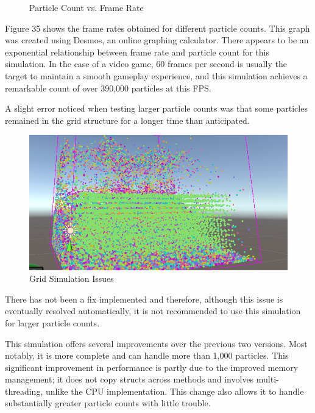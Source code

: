 \documentclass[12pt]{article}
\newcommand{\wideimage}[2][]{%
  \makebox[\textwidth][c]{\texttt{[image: \#2]}}%
}
\begin{document}
    \begin{figure}[H]
        \begin{center}
            \wideimage[width=1.15\textwidth]{exponentialRegression.png}
            \caption{Particle Count vs. Frame Rate \cite{desmos}}
        \end{center}
    \end{figure}

    Figure 35 shows the frame rates obtained for different particle counts. This graph was created using Desmos, an online graphing calculator\cite{desmos}. There appears to be an exponential relationship between frame rate and particle count for this simulation. In the case of a video game, 60 frames per second is usually the target to maintain a smooth gameplay experience, and this simulation achieves a remarkable count of over 390,000 particles at this FPS. 
    
    A slight error noticed when testing larger particle counts was that some particles remained in the grid structure for a longer time than anticipated.

    \begin{figure}[H]
        \begin{center}
            \includegraphics[]{gridIssues.png}
            \caption{Grid Simulation Issues}
        \end{center}
    \end{figure}

    There has not been a fix implemented and therefore, although this issue is eventually resolved automatically, it is not recommended to use this simulation for larger particle counts.

    This simulation offers several improvements over the previous two versions. Most notably, it is more complete and can handle more than 1,000 particles. This significant improvement in performance is partly due to the improved memory management; it does not copy structs across methods and involves multi-threading, unlike the CPU implementation. This change also allows it to handle substantially greater particle counts with little trouble.
\end{document}
